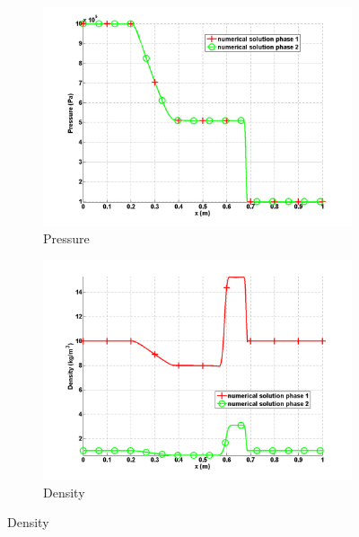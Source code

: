 \documentclass{anstrans}
\begin{document}
\begin{figure}[H]
        \centering
        \begin{subfigure}[b]{0.5\textwidth}
                \centering
                \includegraphics[width=\textwidth]{plots/relaxation_two_phases_pressure.png}
                \caption{Pressure}
                \label{fig:pressure}
        \end{subfigure}%

        \begin{subfigure}[b]{0.5\textwidth}
                \centering
                \includegraphics[width=\textwidth]{plots/relaxation_two_phases_density.png}
                \caption{Density}
                \label{fig:density}
        \end{subfigure}%


\end{figure}
\end{document}
